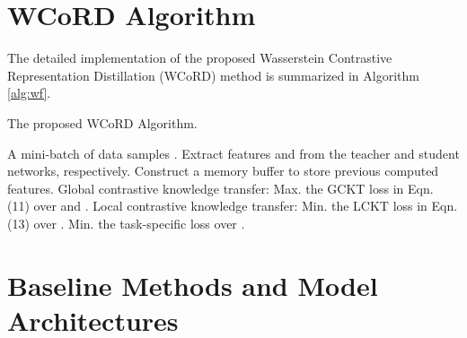 \documentclass[final]{cvpr}
\theoremstyle{definition}
\begin{document}
\section{WCoRD Algorithm}
The detailed implementation of the proposed Wasserstein Contrastive Representation Distillation (WCoRD) method is summarized in Algorithm \ref{alg:wf}.
\begin{algorithm}[!h]
\caption{The proposed WCoRD Algorithm.}
\label{alg:wf}
\begin{algorithmic}[1]
 A mini-batch of data samples .
\STATE Extract features  and  from the teacher and student networks, respectively.
\STATE Construct a memory buffer  to store previous computed features.
\STATE Global contrastive knowledge transfer: 
\STATE \quad Max. the GCKT loss in Eqn. (11) over  and .
\STATE Local contrastive knowledge transfer: 
\STATE \quad Min. the LCKT loss in Eqn. (13) over .
\STATE Min. the task-specific loss over .
\end{algorithmic}
\end{algorithm} 









\section{Baseline Methods and Model Architectures}
\end{document}
